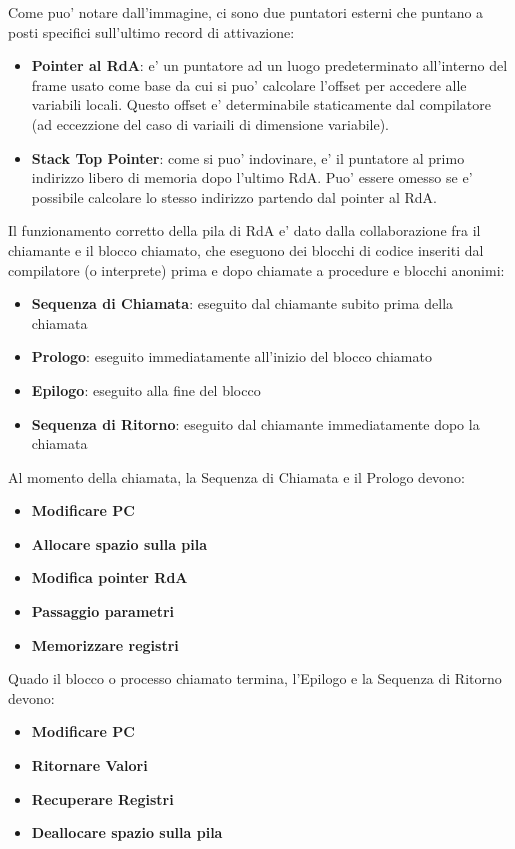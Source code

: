 Come puo' notare dall'immagine, ci sono due puntatori esterni che puntano a posti specifici sull'ultimo record di attivazione:
\begin{itemize}
  \item \textbf{Pointer al RdA}: e' un puntatore ad un luogo predeterminato all'interno del frame usato come base da cui si puo' calcolare l'offset per accedere alle variabili locali. Questo offset e' determinabile staticamente dal compilatore (ad eccezzione del caso di variaili di dimensione variabile).
\item \textbf{Stack Top Pointer}: come si puo' indovinare, e' il puntatore al primo indirizzo libero di memoria dopo l'ultimo RdA. Puo' essere omesso se e' possibile calcolare lo stesso indirizzo partendo dal pointer al RdA.
\end{itemize}

Il funzionamento corretto della pila di RdA e' dato dalla collaborazione fra il chiamante e il blocco chiamato, che eseguono dei blocchi di codice inseriti dal compilatore (o interprete) prima e dopo chiamate a procedure e blocchi anonimi:
\begin{itemize}
\item \textbf{Sequenza di Chiamata}: eseguito dal chiamante subito prima della chiamata
\item \textbf{Prologo}: eseguito immediatamente all'inizio del blocco chiamato
\item \textbf{Epilogo}: eseguito alla fine del blocco
\item \textbf{Sequenza di Ritorno}: eseguito dal chiamante immediatamente dopo la chiamata
\end{itemize}

Al momento della chiamata, la Sequenza di Chiamata e il Prologo devono:
\begin{itemize}
\item \textbf{Modificare PC}
\item \textbf{Allocare spazio sulla pila}
\item \textbf{Modifica pointer RdA}
\item \textbf{Passaggio parametri}
\item \textbf{Memorizzare registri}
\end{itemize}

Quado il blocco o processo chiamato termina, l'Epilogo e la Sequenza di Ritorno devono:
\begin{itemize}
\item \textbf{Modificare PC}
\item \textbf{Ritornare Valori}
\item \textbf{Recuperare Registri}
\item \textbf{Deallocare spazio sulla pila}
\end{itemize}

